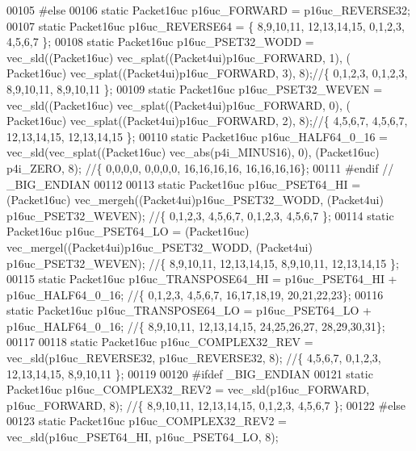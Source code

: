 \begin{DoxyCode}
00105 \textcolor{preprocessor}{#else}
00106 \textcolor{keyword}{static} Packet16uc p16uc\_FORWARD = p16uc\_REVERSE32; 
00107 \textcolor{keyword}{static} Packet16uc p16uc\_REVERSE64 = \{ 8,9,10,11, 12,13,14,15, 0,1,2,3, 4,5,6,7 \};
00108 \textcolor{keyword}{static} Packet16uc p16uc\_PSET32\_WODD = vec\_sld((Packet16uc) vec\_splat((Packet4ui)p16uc\_FORWARD, 1), (
      Packet16uc) vec\_splat((Packet4ui)p16uc\_FORWARD, 3), 8);\textcolor{comment}{//\{ 0,1,2,3, 0,1,2,3, 8,9,10,11, 8,9,10,11 \};}
00109 \textcolor{keyword}{static} Packet16uc p16uc\_PSET32\_WEVEN = vec\_sld((Packet16uc) vec\_splat((Packet4ui)p16uc\_FORWARD, 0), (
      Packet16uc) vec\_splat((Packet4ui)p16uc\_FORWARD, 2), 8);\textcolor{comment}{//\{ 4,5,6,7, 4,5,6,7, 12,13,14,15, 12,13,14,15 \};}
00110 \textcolor{keyword}{static} Packet16uc p16uc\_HALF64\_0\_16 = vec\_sld(vec\_splat((Packet16uc) vec\_abs(p4i\_MINUS16), 0), (Packet16uc)
      p4i\_ZERO, 8);      \textcolor{comment}{//\{ 0,0,0,0, 0,0,0,0, 16,16,16,16, 16,16,16,16\};}
00111 \textcolor{preprocessor}{#endif // \_BIG\_ENDIAN}
00112 
00113 \textcolor{keyword}{static} Packet16uc p16uc\_PSET64\_HI = (Packet16uc) vec\_mergeh((Packet4ui)p16uc\_PSET32\_WODD, (Packet4ui)
      p16uc\_PSET32\_WEVEN);     \textcolor{comment}{//\{ 0,1,2,3, 4,5,6,7, 0,1,2,3, 4,5,6,7 \};}
00114 \textcolor{keyword}{static} Packet16uc p16uc\_PSET64\_LO = (Packet16uc) vec\_mergel((Packet4ui)p16uc\_PSET32\_WODD, (Packet4ui)
      p16uc\_PSET32\_WEVEN);     \textcolor{comment}{//\{ 8,9,10,11, 12,13,14,15, 8,9,10,11, 12,13,14,15 \};}
00115 \textcolor{keyword}{static} Packet16uc p16uc\_TRANSPOSE64\_HI = p16uc\_PSET64\_HI + p16uc\_HALF64\_0\_16;                              
                 \textcolor{comment}{//\{ 0,1,2,3, 4,5,6,7, 16,17,18,19, 20,21,22,23\};}
00116 \textcolor{keyword}{static} Packet16uc p16uc\_TRANSPOSE64\_LO = p16uc\_PSET64\_LO + p16uc\_HALF64\_0\_16;                              
                 \textcolor{comment}{//\{ 8,9,10,11, 12,13,14,15, 24,25,26,27, 28,29,30,31\};}
00117 
00118 \textcolor{keyword}{static} Packet16uc p16uc\_COMPLEX32\_REV = vec\_sld(p16uc\_REVERSE32, p16uc\_REVERSE32, 8);                      
                         \textcolor{comment}{//\{ 4,5,6,7, 0,1,2,3, 12,13,14,15, 8,9,10,11 \};}
00119 
00120 \textcolor{preprocessor}{#ifdef \_BIG\_ENDIAN}
00121 \textcolor{keyword}{static} Packet16uc p16uc\_COMPLEX32\_REV2 = vec\_sld(p16uc\_FORWARD, p16uc\_FORWARD, 8);                         
                         \textcolor{comment}{//\{ 8,9,10,11, 12,13,14,15, 0,1,2,3, 4,5,6,7 \};}
00122 \textcolor{preprocessor}{#else}
00123 \textcolor{keyword}{static} Packet16uc p16uc\_COMPLEX32\_REV2 = vec\_sld(p16uc\_PSET64\_HI, p16uc\_PSET64\_LO, 8);                     

\end{DoxyCode}
